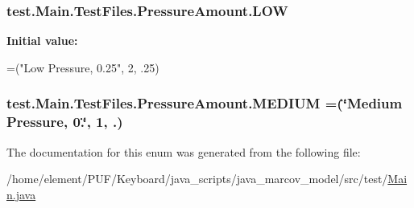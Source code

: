 \subsubsection[{\texorpdfstring{L\+OW}{LOW}}]{\setlength{\rightskip}{0pt plus 5cm}test.\+Main.\+Test\+Files.\+Pressure\+Amount.\+L\+OW}\hypertarget{enumtest_1_1_main_1_1_test_files_1_1_pressure_amount_a7e4af3a5f4b0df871b174b6154903545}{}\label{enumtest_1_1_main_1_1_test_files_1_1_pressure_amount_a7e4af3a5f4b0df871b174b6154903545}
{\bfseries Initial value\+:}
\begin{DoxyCode}
=(\textcolor{stringliteral}{"Low Pressure, 0.25"}, 2,
                    .25)
\end{DoxyCode}
\subsubsection[{\texorpdfstring{M\+E\+D\+I\+UM}{MEDIUM}}]{\setlength{\rightskip}{0pt plus 5cm}test.\+Main.\+Test\+Files.\+Pressure\+Amount.\+M\+E\+D\+I\+UM =(\char`\"{}Medium Pressure, 0.\char`\"{}, 1, .)}\hypertarget{enumtest_1_1_main_1_1_test_files_1_1_pressure_amount_a42949a0c635d96edf5eedd231e539e2c}{}\label{enumtest_1_1_main_1_1_test_files_1_1_pressure_amount_a42949a0c635d96edf5eedd231e539e2c}


The documentation for this enum was generated from the following file\+:\begin{DoxyCompactItemize}
\item 
/home/element/\+P\+U\+F/\+Keyboard/java\+\_\+scripts/java\+\_\+marcov\+\_\+model/src/test/\hyperlink{_main_8java}{Main.\+java}\end{DoxyCompactItemize}
